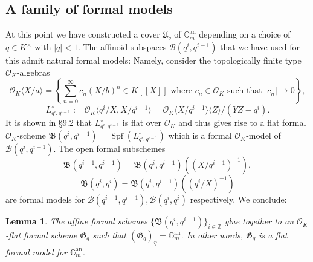\documentclass[10pt,oneside]{amsart}
\newtheorem{lemma}[theorem]{Lemma}
\theoremstyle{definition}
\begin{document}
	\subsection{A family of formal models}
	At this point we have constructed a cover $\mathfrak U_q$ of $\mathbb G_m^{\operatorname{an}}$ depending on a choice of $q\in K^\times$ with $|q|<1$. 
	The affinoid subspaces $\mathcal B(q^i,q^{i-1})$ that we have used for this admit natural formal models: Namely, consider the topologically finite type $\mathcal O_K$-algebras
	\[\mathcal O_K\langle X/a\rangle = \left\{\sum_{n=0}^{\infty} c_n (X/b)^n\in K[[X]] \text{ where } c_n\in \mathcal O_K \text{ such that } |c_n|\to 0 \right\},\]
	\[L_{q^i,q^{i-1}}^\circ :=\mathcal O_K\langle q^i/X, X/q^{i-1}\rangle = \mathcal O_K\langle X/q^{i-1}\rangle\langle Z\rangle/(YZ-q^i).\]
	It is shown in \cite{Bosch lectures} \S 9.2 that $L_{q^i,q^{i-1}}^\circ$  is flat over $\mathcal O_K$ and thus gives rise to a flat formal $\mathcal O_K$-scheme $\mathfrak B(q^i,q^{i-1})=\operatorname{Spf}(L_{q^i,q^{i-1}}^\circ)$ which is a formal $\mathcal O_K$-model of $\mathcal B(q^i,q^{i-1})$. The open formal subschemes 
	\[\mathfrak B(q^{i-1},q^{i-1})=\mathfrak B(q^i,q^{i-1})((X/q^{i-1})^{-1}),\]
	\[\mathfrak B(q^{i},q^{i})=\mathfrak B(q^i,q^{i-1})((q^{i}/X)^{-1})\]		
	are formal models for $\mathcal B(q^{i-1},q^{i-1}), \mathcal B(q^i,q^i)$ respectively. We conclude:

	\begin{lemma}\label{formal model of torus}
		The affine formal schemes $\{\mathfrak B(q^i,q^{i-1})\}_{i\in\mathbb Z}$ glue together to an $\mathcal O_K$-flat formal scheme $\mathfrak G_q$ such that $(\mathfrak G_q)_\eta = \mathbb G_m^{\operatorname{an}}$. In other words, $\mathfrak G_q$ is a flat formal model for $\mathbb G_m^{\operatorname{an}}$.
	\end{lemma}
	
\end{document}
